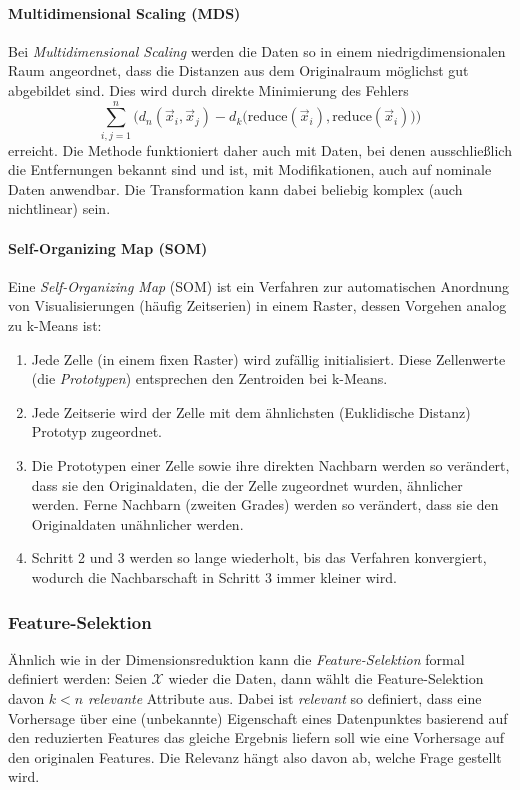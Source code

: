 				\paragraph{Multidimensional Scaling (MDS)}
					Bei \emph{Multidimensional Scaling} werden die Daten so in einem niedrigdimensionalen Raum angeordnet, dass die Distanzen aus dem Originalraum möglichst gut abgebildet sind. Dies wird durch direkte Minimierung des Fehlers
					\begin{equation}
						\sum_{i, j = 1}^{n} \bigl( d_n(\vec{x}_i, \vec{x}_j) - d_k\bigl( \mathrm{reduce}(\vec{x}_i), \mathrm{reduce}(\vec{x}_i) \bigr) \bigr)
					\end{equation}
					erreicht. Die Methode funktioniert daher auch mit Daten, bei denen ausschließlich die Entfernungen bekannt sind und ist, mit Modifikationen, auch auf nominale Daten anwendbar. Die Transformation kann dabei beliebig komplex (auch nichtlinear) sein.

				\paragraph{Self-Organizing Map (SOM)}
					\label{p:som}

					Eine \emph{Self-Organizing Map} (SOM) ist ein Verfahren zur automatischen Anordnung von Visualisierungen (häufig Zeitserien) in einem Raster, dessen Vorgehen analog zu k-Means ist:
					\begin{enumerate}
						\item Jede Zelle (in einem fixen Raster) wird zufällig initialisiert. Diese Zellenwerte (die \emph{Prototypen}) entsprechen den Zentroiden bei k-Means.
						\item Jede Zeitserie wird der Zelle mit dem ähnlichsten (\bspw Euklidische Distanz) Prototyp zugeordnet.
						\item Die Prototypen einer Zelle sowie ihre direkten Nachbarn werden so verändert, dass sie den Originaldaten, die der Zelle zugeordnet wurden, ähnlicher werden. Ferne Nachbarn (zweiten Grades) werden so verändert, dass sie den Originaldaten unähnlicher werden.
						\item Schritt 2 und 3 werden so lange wiederholt, bis das Verfahren konvergiert, wodurch die Nachbarschaft in Schritt 3 immer kleiner wird.
					\end{enumerate}

			\subsubsection{Feature-Selektion}
				Ähnlich wie in der Dimensionsreduktion kann die \emph{Feature-Selektion} formal definiert werden: Seien \(\mathcal{X}\) wieder die Daten, dann wählt die Feature-Selektion davon \( k < n \) \emph{relevante} Attribute aus. Dabei ist \emph{relevant} so definiert, dass eine Vorhersage über eine (unbekannte) Eigenschaft eines Datenpunktes basierend auf den reduzierten Features das gleiche Ergebnis liefern soll wie eine Vorhersage auf den originalen Features. Die Relevanz hängt also davon ab, welche Frage gestellt wird.

